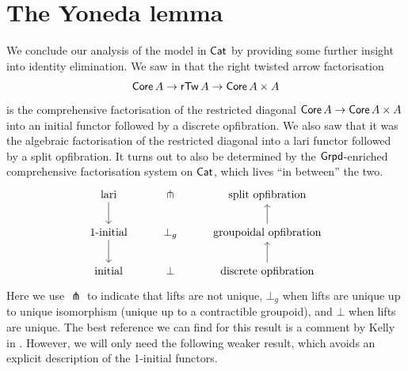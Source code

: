 \section{The Yoneda lemma}
We conclude our analysis of the model in $\mathsf{Cat}$ by
providing some further insight into identity elimination.
We saw in 
that the right twisted arrow factorisation 
\[\mathop{\mathsf{Core}} A \to \mathop{\mathsf{rTw}}{A} \to \mathop{\mathsf{Core}} A \times A\]
is the comprehensive factorisation of the restricted diagonal
$\mathop{\mathsf{Core}} A \to \mathop{\mathsf{Core}} A \times A$
into an initial functor followed by a discrete opfibration.
We also saw that it was the algebraic factorisation
of the restricted diagonal into a lari functor
followed by a split opfibration.
It turns out to also be determined by the $\mathsf{Grpd}$-enriched
comprehensive factorisation system on $\mathsf{Cat}$,
which lives ``in between'' the two.
\[ \begin{tikzcd}
	{\text{lari}} & \pitchfork & {\text{split opfibration}} \\
	{1\text{-initial}} & {\bot_{g}} & {\text{groupoidal opfibration}} \\
	{\text{initial}} & \bot & {\text{discrete opfibration}}
	\arrow[from=1-1, to=2-1]
	\arrow[from=2-1, to=3-1]
	\arrow[from=2-3, to=1-3]
	\arrow[from=3-3, to=2-3]
\end{tikzcd} \]
Here we use $\pitchfork$ to indicate that lifts are not unique,
$\bot_g$ when lifts are unique up to unique isomorphism
(unique up to a contractible groupoid),
and $\bot$ when lifts are unique.
The best reference we can find for this result is a comment by Kelly in
\cite[4.7]{kelly1982}.
However, we will only need the following weaker result,
which avoids an explicit description of the 1-initial functors.

